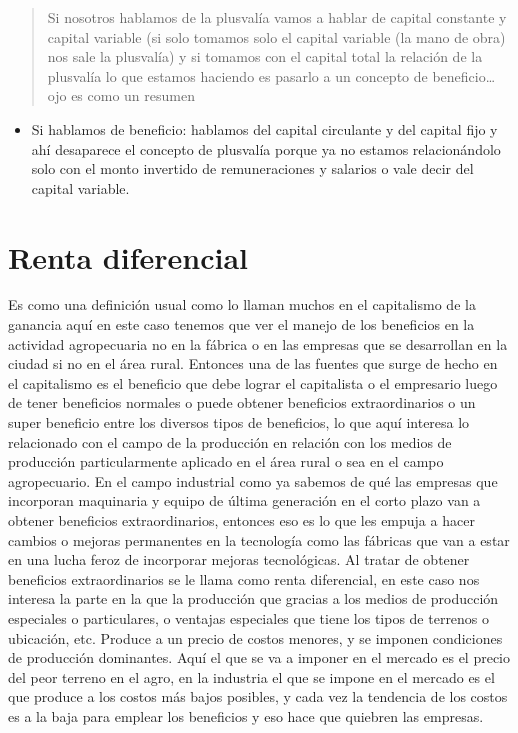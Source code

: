 \documentclass[
  letterpaper,
  DIV=11,
  numbers=noendperiod]{scrartcl}
\providecommand{\tightlist}{%
  \setlength{\itemsep}{0pt}\setlength{\parskip}{0pt}}\usepackage{longtable,booktabs,array}
\begin{document}
\begin{quote}
Si nosotros hablamos de la plusvalía vamos a hablar de capital constante
y capital variable (si solo tomamos solo el capital variable (la mano de
obra) nos sale la plusvalía) y si tomamos con el capital total la
relación de la plusvalía lo que estamos haciendo es pasarlo a un
concepto de beneficio\ldots ojo es como un resumen
\end{quote}

\begin{itemize}
\tightlist
\item
  Si hablamos de beneficio: hablamos del capital circulante y del
  capital fijo y ahí desaparece el concepto de plusvalía porque ya no
  estamos relacionándolo solo con el monto invertido de remuneraciones y
  salarios o vale decir del capital variable.
\end{itemize}

\hypertarget{renta-diferencial}{%
\section{Renta diferencial}\label{renta-diferencial}}

Es como una definición usual como lo llaman muchos en el capitalismo de
la ganancia aquí en este caso tenemos que ver el manejo de los
beneficios en la actividad agropecuaria no en la fábrica o en las
empresas que se desarrollan en la ciudad si no en el área rural.
Entonces una de las fuentes que surge de hecho en el capitalismo es el
beneficio que debe lograr el capitalista o el empresario luego de tener
beneficios normales o puede obtener beneficios extraordinarios o un
super beneficio entre los diversos tipos de beneficios, lo que aquí
interesa lo relacionado con el campo de la producción en relación con
los medios de producción particularmente aplicado en el área rural o sea
en el campo agropecuario. En el campo industrial como ya sabemos de qué
las empresas que incorporan maquinaria y equipo de última generación en
el corto plazo van a obtener beneficios extraordinarios, entonces eso es
lo que les empuja a hacer cambios o mejoras permanentes en la tecnología
como las fábricas que van a estar en una lucha feroz de incorporar
mejoras tecnológicas. Al tratar de obtener beneficios extraordinarios se
le llama como renta diferencial, en este caso nos interesa la parte en
la que la producción que gracias a los medios de producción especiales o
particulares, o ventajas especiales que tiene los tipos de terrenos o
ubicación, etc. Produce a un precio de costos menores, y se imponen
condiciones de producción dominantes. Aquí el que se va a imponer en el
mercado es el precio del peor terreno en el agro, en la industria el que
se impone en el mercado es el que produce a los costos más bajos
posibles, y cada vez la tendencia de los costos es a la baja para
emplear los beneficios y eso hace que quiebren las empresas.
\end{document}
